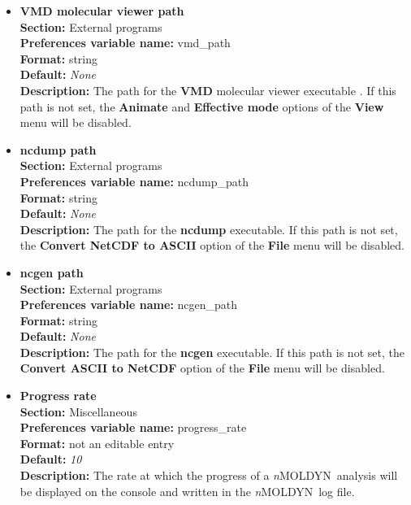 \documentclass[a4paper,11pt]{report}
\newcommand{\NMOLDYN}{\textit{n}MOLDYN}
\begin{document}
\begin{itemize}
\hypertarget{preferences_vmd_path}{}
\item \textbf{VMD molecular viewer path}\\
\textbf{Section:} External programs\\
\textbf{Preferences variable name:} vmd\_path\\
\textbf{Format:} string\\
\textbf{Default:} \textit{None}\\
\textbf{Description:} The path for the \textbf{VMD} molecular viewer executable \cite{VMD}. If this path is not set, the 
\textbf{Animate} and \textbf{Effective mode} options of the \textbf{View}  menu will be disabled.
\newpage
\hypertarget{preferences_ncdump_path}{}
\item \textbf{ncdump path}\\
\textbf{Section:} External programs\\
\textbf{Preferences variable name:} ncdump\_path\\
\textbf{Format:} string\\
\textbf{Default:} \textit{None}\\
\textbf{Description:} The path for the \textbf{ncdump} executable. If this path is not set, the 
\textbf{Convert NetCDF to ASCII} option of the \textbf{File} menu will be disabled.

\hypertarget{preferences_ncgen_path}{}
\item \textbf{ncgen path}\\
\textbf{Section:} External programs\\
\textbf{Preferences variable name:} ncgen\_path\\
\textbf{Format:} string\\
\textbf{Default:} \textit{None}\\
\textbf{Description:} The path for the \textbf{ncgen} executable. 
If this path is not set, the \textbf{Convert ASCII to NetCDF} option of the \textbf{File} menu will be disabled.

\hypertarget{preferences_progress_rate}{}
\item \textbf{Progress rate}\\
\textbf{Section:} Miscellaneous\\
\textbf{Preferences variable name:} progress\_rate\\
\textbf{Format:} not an editable entry\\
\textbf{Default:} \textit{10}\\
\textbf{Description:} The rate at which the progress of a \NMOLDYN\ analysis will be displayed on the console and written 
in the \NMOLDYN\ log file.


\end{itemize}
\end{document}
